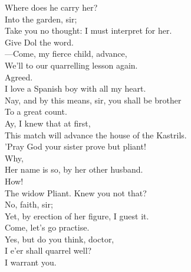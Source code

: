 \documentclass[a4paper,oneside]{memoir}
\begin{document}
\begin{drama*}
\kastrilspeaks Where does he carry her?\\
\facespeaks {} Into the garden, sir;\\
Take you no thought: I must interpret for her.\\
\subtlespeaks Give Dol the word.\\
---Come, my fierce child, advance,\\
We'll to our quarrelling lesson again.\\
\kastrilspeaks Agreed.\\
I love a Spanish boy with all my heart.\\
\subtlespeaks Nay, and by this means, sir, you shall be brother\\
To a great count.\\
\kastrilspeaks {} Ay, I knew that at first,\\
This match will advance the house of the Kastrils.\\
\subtlespeaks 'Pray God your sister prove but pliant!\\
\kastrilspeaks {} Why,\\
Her name is so, by her other husband.\\
\subtlespeaks How!\\
\kastrilspeaks {} The widow Pliant. Knew you not that?\\
\subtlespeaks No, faith, sir;\\
Yet, by erection of her figure, I guest it.\\
Come, let's go practise.\\
\kastrilspeaks {} Yes, but do you think, doctor,\\
I e'er shall quarrel well?\\
\subtlespeaks {} I warrant you.\\
\scene


\end{drama*}
\end{document}
